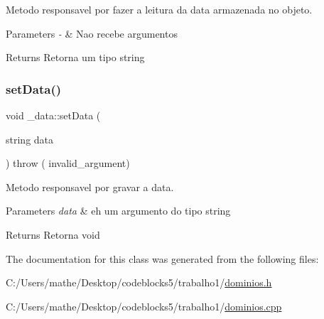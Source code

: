 Metodo responsavel por fazer a leitura da data armazenada no objeto. 


\begin{DoxyParams}{Parameters}
{\em -\/} & Nao recebe argumentos \\
\hline
\end{DoxyParams}
\begin{DoxyReturn}{Returns}
Retorna um tipo string 
\end{DoxyReturn}
\mbox{\label{class__data_a12f8f576e3d375bd9523c24c1fb24616}} 
\subsubsection{\texorpdfstring{setData()}{setData()}}
{\footnotesize\ttfamily void \+\_\+data\+::set\+Data (\begin{DoxyParamCaption}\item[{string}]{data }\end{DoxyParamCaption}) throw ( invalid\+\_\+argument) }



Metodo responsavel por gravar a data. 


\begin{DoxyParams}{Parameters}
{\em data} & eh um argumento do tipo string \\
\hline
\end{DoxyParams}
\begin{DoxyReturn}{Returns}
Retorna void 
\end{DoxyReturn}


The documentation for this class was generated from the following files\+:\begin{DoxyCompactItemize}
\item 
C\+:/\+Users/mathe/\+Desktop/codeblocks5/trabalho1/\mbox{\hyperlink{dominios_8h}{dominios.\+h}}\item 
C\+:/\+Users/mathe/\+Desktop/codeblocks5/trabalho1/\mbox{\hyperlink{dominios_8cpp}{dominios.\+cpp}}\end{DoxyCompactItemize}

